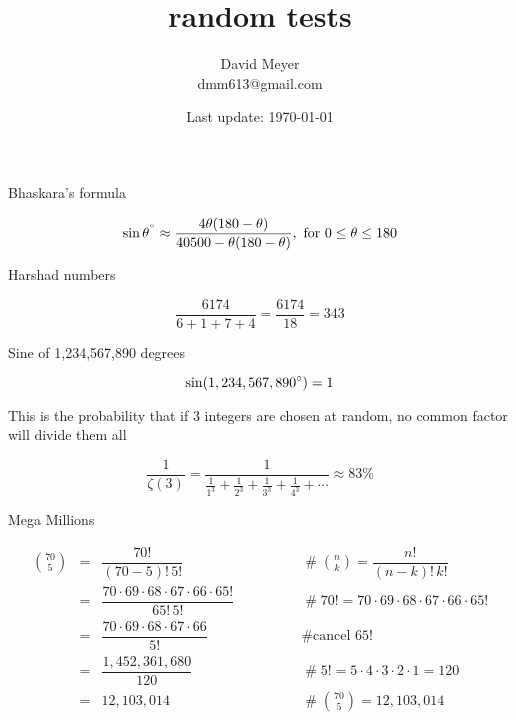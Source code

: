 \documentclass[11pt, oneside]{article}
\title{random tests}
\author{David Meyer \\ dmm613@gmail.com}
\date{Last update: \today}
\theoremstyle{definition}
\begin{document}
\maketitle

\bigskip
\noindent
Bhaskara’s formula


{\huge
\begin{equation*}
\sin \theta^{\degree} \approx \dfrac{4\theta (180 - \theta)}{40500 - \theta(180-\theta)},
\text{ for $0 \leq \theta \leq 180$}
\end{equation*}
}

\bigskip
\noindent
Harshad numbers

{\huge
\begin{equation*}
\dfrac{6174}{6+1+7+4} = \dfrac{6174}{18} = 343
\end{equation*}
}


\bigskip
\noindent
Sine of 1,234,567,890 degrees

{\huge
\begin{equation*}
\sin (1,234,567,890\degree) = 1
\end{equation*}
}

\bigskip
\noindent
This is the probability that if 3 integers are chosen at random, 
no common factor will divide them all

{\huge
\begin{equation*}
\dfrac{1}{\zeta(3)} = \dfrac{1}{\frac{1}{1^3} + \frac{1}{2^3} + \frac{1}{3^3} + \frac{1}{4^3} + \cdots} \approx 83\%
\end{equation*}
}




\bigskip
\noindent
Mega Millions

{\Large
\begin{equation*}
\begin{array}{llll}
{\displaystyle {70 \choose 5}}
&=& \dfrac{70!}{(70-5)! \, 5!} 									
				&\qquad \qquad \mathrel{\#} {\displaystyle {n \choose k}} = \dfrac{n!}{(n-k)!\,k!} \\
[25pt]
&=& \dfrac{70\cdot 69\cdot68\cdot67\cdot66\cdot65!}{65! \, 5!} 	
				&\qquad \qquad \mathrel{\#} 70! = 70\cdot69\cdot68\cdot67\cdot66\cdot65! \\
[25pt]
&=& \dfrac{70\cdot69\cdot68\cdot67\cdot66}{5!} 					
				&\qquad \qquad \mathrel{\#} \text{cancel 65!}\\
[25pt]
&=& \dfrac{1,452,361,680}{120} 									
				&\qquad \qquad \mathrel{\#} 5! = 5 \cdot 4 \cdot 3 \cdot 2 \cdot 1 = 120 \\
[20pt]
&=&  12,103,014													
				&\qquad \qquad \mathrel{\#} {\displaystyle {70 \choose 5} = 12,103,014}
\end{array}
\end{equation*}}
\end{document}
